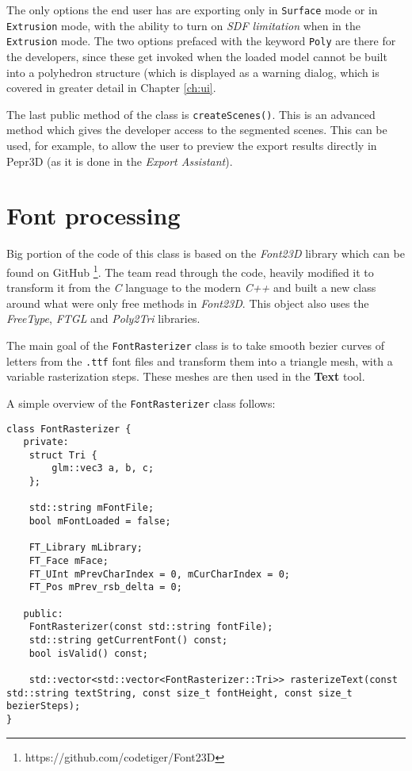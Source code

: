The only options the end user has are exporting only in \texttt{Surface} mode or in \texttt{Extrusion} mode, with the ability to turn on \textit{SDF limitation} when in the \texttt{Extrusion} mode. The two options prefaced with the keyword \texttt{Poly} are there for the developers, since these get invoked when the loaded model cannot be built into a polyhedron structure (which is displayed as a warning dialog, which is covered in greater detail in Chapter \ref{ch:ui}.

The last public method of the class is \texttt{createScenes()}. This is an advanced method which gives the developer access to the segmented scenes. This can be used, for example, to allow the user to preview the export results directly in Pepr3D (as it is done in the \textit{Export Assistant}).

\section{Font processing}
\label{sec:fonts}

Big portion of the code of this class is based on the \textit{Font23D} library which can be found on GitHub \footnote{https://github.com/codetiger/Font23D}. The team read through the code, heavily modified it to transform it from the \textit{C} language to the modern \textit{C++} and built a new class around what were only free methods in \textit{Font23D}. This object also uses the \textit{FreeType}, \textit{FTGL} and \textit{Poly2Tri} libraries.

The main goal of the \texttt{FontRasterizer} class is to take smooth bezier curves of letters from the \texttt{.ttf} font files and transform them into a triangle mesh, with a variable rasterization steps. These meshes are then used in the \textbf{Text} tool.

A simple overview of the \texttt{FontRasterizer} class follows:

\begin{lstlisting}
class FontRasterizer {
   private:
	struct Tri {
        glm::vec3 a, b, c;
    };

    std::string mFontFile;
    bool mFontLoaded = false;

    FT_Library mLibrary;
    FT_Face mFace;
    FT_UInt mPrevCharIndex = 0, mCurCharIndex = 0;
    FT_Pos mPrev_rsb_delta = 0;

   public:
    FontRasterizer(const std::string fontFile);
    std::string getCurrentFont() const;
    bool isValid() const;

    std::vector<std::vector<FontRasterizer::Tri>> rasterizeText(const std::string textString, const size_t fontHeight, const size_t bezierSteps);
}
\end{lstlisting}

